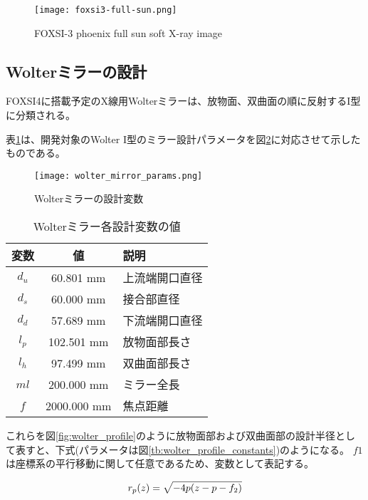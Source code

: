 \begin{figure}[h]
\centering
\texttt{[image: foxsi3-full-sun.png]}
\caption{FOXSI-3 phoenix full sun soft X-ray image \cite{weko_20796_1}}
\label{fig:foxsi-fullsun-image}
\end{figure}

\subsection{Wolterミラーの設計}
\label{chap1_wolter_arrangement}
FOXSI4に搭載予定のX線用Wolterミラーは、放物面、双曲面の順に反射するI型に分類される。

表\ref{tb:wolter_params}は、開発対象のWolter I型のミラー設計パラメータを図\ref{fig:wolter_params}に対応させて示したものである。

\begin{figure}[h!]
\centering
\texttt{[image: wolter\_mirror\_params.png]}
\caption{Wolterミラーの設計変数}
\label{fig:wolter_params}
\end{figure}

\begin{table}[ht]
\begin{center}
  \begin{tabular}{|c|c|l|} \hline
    変数 & 値 & 説明 \\ \hline
    $d_u$ & 60.801 mm & 上流端開口直径 \\
    $d_s$ & 60.000 mm & 接合部直径 \\
    $d_d$ & 57.689 mm & 下流端開口直径 \\
    $l_p$ & 102.501 mm & 放物面部長さ \\
    $l_h$ & 97.499 mm & 双曲面部長さ \\
    $ml$ & 200.000 mm & ミラー全長 \\
    $f$ & 2000.000 mm & 焦点距離 \\ \hline
  \end{tabular}
  \caption{Wolterミラー各設計変数の値}
  \label{tb:wolter_params}
\end{center}
\end{table}

これらを図\ref{fig:wolter_profile}のように放物面部および双曲面部の設計半径として表すと、下式(パラメータは図\ref{tb:wolter_profile_constants})のようになる。
$f1$は座標系の平行移動に関して任意であるため、変数として表記する。

\begin{equation}
    r_p(z) = \sqrt{ -4p(z - p - f_2) } \\
\end{equation}

